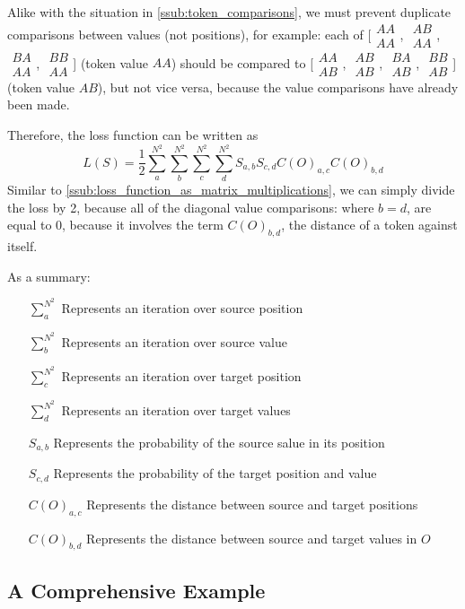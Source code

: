 Alike with the situation in \ref{ssub:token_comparisons}, we must prevent duplicate comparisons between values (not positions), for example: each of %
[$\begin{smallmatrix}AA\\AA\end{smallmatrix}$,%
$\begin{smallmatrix}AB\\AA\end{smallmatrix}$,%
$\begin{smallmatrix}BA\\AA\end{smallmatrix}$,%
$\begin{smallmatrix}BB\\AA\end{smallmatrix}$] (token value $AA$) should be compared to
[$\begin{smallmatrix}AA\\AB\end{smallmatrix}$,%
$\begin{smallmatrix}AB\\AB\end{smallmatrix}$,%
$\begin{smallmatrix}BA\\AB\end{smallmatrix}$,%
$\begin{smallmatrix}BB\\AB\end{smallmatrix}$] (token value $AB$), but not vice versa, because the value comparisons have already been made.

Therefore, the loss function can be written as
\begin{equation}
    L(S)=\frac{1}{2}\sum_{a}^{N^2} \sum_{b}^{N^2} \sum_{c}^{N^2} \sum_{d}^{N^2} S_{a,b} S_{c,d} C(O)_{a,c}C(O)_{b,d}
\end{equation}
Similar to \ref{ssub:loss_function_as_matrix_multiplications}, we can simply divide the loss by 2, because all of the diagonal value comparisons: where $b=d$, are equal to $0$, because it involves the term $C(O)_{b,d}$, the distance of a token against itself.

As a summary:
\begin{itemize}
    \item [$\sum_{a}^{N^2}$] Represents an iteration over source position
    \item [$\sum_{b}^{N^2}$] Represents an iteration over source value
    \item [$\sum_{c}^{N^2}$] Represents an iteration over target position
    \item [$\sum_{d}^{N^2}$] Represents an iteration over target values
    \item [$S_{a,b}$] Represents the probability of the source salue in its position
    \item [$S_{c,d}$] Represents the probability of the target position and value
    \item [$C(O)_{a,c}$] Represents the distance between source and target positions
    \item [$C(O)_{b,d}$] Represents the distance between source and target values in $O$
\end{itemize}

\subsection{A Comprehensive Example}%
\label{sub:a_comprehensive_example_2}


